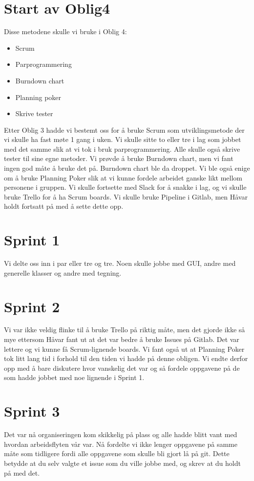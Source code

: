 \documentclass[11pt]{article}
\begin{document}
\section*{Start av Oblig4}
Disse metodene skulle vi bruke i Oblig 4:
\begin{itemize}
\item Scrum
\item Parprogrammering
\item Burndown chart
\item Planning poker
\item Skrive tester
\end{itemize}

\vspace{1em}

\noindent Etter Oblig 3 hadde vi bestemt oss for å bruke Scrum som
utviklingsmetode der vi skulle ha fast møte 1 gang i uken.
Vi skulle sitte to eller tre i lag som jobbet med det samme slik at vi tok i bruk parprogrammering.
Alle skulle også skrive tester til sine egne metoder. 
Vi prøvde å bruke Burndown chart, men vi fant ingen god måte å bruke det på. 
Burndown chart ble da droppet. Vi ble også enige om å bruke Planning Poker slik
at vi kunne fordele arbeidet ganske likt mellom personene i gruppen.
Vi skulle fortsette med Slack for å snakke i lag, og vi skulle bruke Trello for å ha Scrum boards. 
Vi skulle bruke Pipeline i Gitlab, men Håvar holdt fortsatt på med å sette dette
opp.

\section*{Sprint 1}
Vi delte oss inn i par eller tre og tre. Noen skulle jobbe med GUI, andre med generelle klasser og andre med tegning.

\section*{Sprint 2}
Vi var ikke veldig flinke til å bruke Trello på riktig måte, men det gjorde ikke
så mye ettersom Håvar fant ut at det var bedre å bruke Issues på Gitlab. Det var
lettere og vi kunne få Scrum-lignende boards.
Vi fant også ut at Planning Poker tok litt lang tid i forhold til den tiden vi
hadde på denne obligen. Vi endte derfor opp med å bare diskutere hvor vanskelig
det var og så fordele oppgavene på de som hadde jobbet med noe lignende i Sprint 1.

\section*{Sprint 3}
Det var nå organiseringen kom skikkelig på plass og alle hadde blitt vant med hvordan arbeidsflyten vår var. Nå fordelte vi ikke lenger oppgavene på samme måte som tidligere fordi alle oppgavene som skulle bli gjort lå på git. 
Dette betydde at du selv valgte et issue som du ville jobbe med, og skrev at du
holdt på med det.
\end{document}

